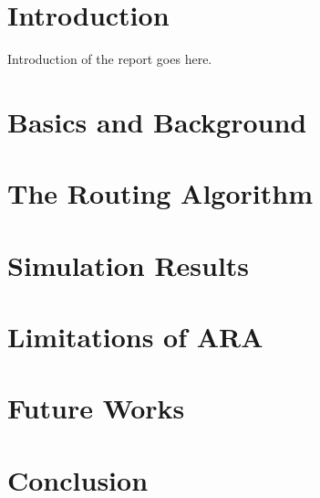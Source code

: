 \section{Introduction}
Introduction of the report goes here. 


\section{Basics and Background}


\section{The Routing Algorithm}

\section{Simulation Results}
\section{Limitations of ARA}
\section{Future Works}
\section{Conclusion}

